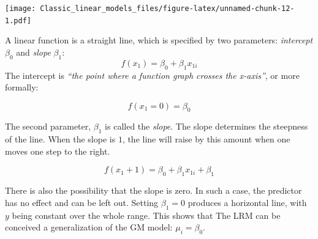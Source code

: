 \documentclass[]{svmono}
\newenvironment{Shaded}{\begin{snugshade}}{\end{snugshade}}
\newcommand{\KeywordTok}[1]{\textcolor[rgb]{0.13,0.29,0.53}{\textbf{#1}}}
\newcommand{\DataTypeTok}[1]{\textcolor[rgb]{0.13,0.29,0.53}{#1}}
\newcommand{\DecValTok}[1]{\textcolor[rgb]{0.00,0.00,0.81}{#1}}
\newcommand{\FloatTok}[1]{\textcolor[rgb]{0.00,0.00,0.81}{#1}}
\newcommand{\StringTok}[1]{\textcolor[rgb]{0.31,0.60,0.02}{#1}}
\newcommand{\OperatorTok}[1]{\textcolor[rgb]{0.81,0.36,0.00}{\textbf{#1}}}
\newcommand{\NormalTok}[1]{#1}
\theoremstyle{definition}
\theoremstyle{definition}
\theoremstyle{definition}
\theoremstyle{remark}
\begin{document}
\begin{Shaded}
\end{Shaded}

\texttt{[image: Classic\_linear\_models\_files/figure-latex/unnamed-chunk-12-1.pdf]}

A linear function is a straight line, which is specified by two
parameters: \emph{intercept} \(\beta_0\) and \emph{slope} \(\beta_1\):
\[f(x_1) = \beta_0 + \beta_1x_{1i}\] The intercept is \emph{``the point
where a function graph crosses the x-axis''}, or more formally:

\[f(x_1 = 0) = \beta_0\]

The second parameter, \(\beta_1\) is called the \emph{slope}. The slope
determines the steepness of the line. When the slope is \(1\), the line
will raise by this amount when one moves one step to the right.

\[f(x_1 + 1) = \beta_0 + \beta_1x_{1i} + \beta_1\]

There is also the possibility that the slope is zero. In such a case,
the predictor has no effect and can be left out. Setting \(\beta_1 = 0\)
produces a horizontal line, with \(y\) being constant over the whole
range. This shows that The LRM can be conceived a generalization of the
GM model: \(\mu_i = \beta_0\).
\end{document}
